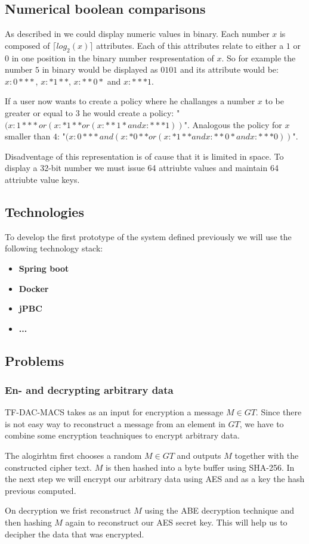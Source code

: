 \subsection{Numerical boolean comparisons}
As described in \cite{bethencourt2007ciphertext} we could display numeric values in binary. Each number $x$ is composed of $\lceil log_2(x) \rceil$ attributes. Each of this attributes relate to either a $1$ or $0$ in one position in the binary number respresentation of $x$. So for example the number $5$ in binary would be displayed as $0101$ and its attribute would be: $x:0***$, $x:*1**$, $x:**0*$ and $x:***1$. 

If a user now wants to create a policy where he challanges a number $x$ to be greater or equal to $3$ he would create a policy: "$(x:1*** or (x:*1** or (x:**1* and x:***1))$". Analogous the policy for $x$ smaller than $4$: "$(x:0*** and (x:*0** or (x:*1** and x:**0* and x:***0))$".

Disadventage of this representation is of cause that it is limited in space. To display a 32-bit number we must issue 64 attriubte values and maintain 64 attriubte value keys. 


\subsection{Technologies}
To develop the first prototype of the system defined previously we will use the following technology stack:

\begin{itemize}
	\item \textbf{Spring boot}
	\item \textbf{Docker}
	\item \textbf{jPBC} \cite{ISCC:DecIov11}
	\item \textbf{...}
\end{itemize}

\subsection{Problems}

\subsubsection{En- and decrypting arbitrary data}
TF-DAC-MACS takes as an input for encryption a message $M \in GT$. Since there is not easy way to reconstruct a message from an element in $GT$, we have to combine some encryption teachniques to encrypt arbitrary data. 

The alogirhtm first chooses a random $M \in GT$ and outputs $M$ together with the constructed cipher text. $M$ is then hashed into a byte buffer using \ac{SHA}-256. In the next step we will encrypt our arbitrary data using \ac{AES} and as a key the hash previous computed. 

On decryption we frist reconstruct $M$ using the ABE decryption technique and then hashing $M$ again to reconstruct our AES secret key. This will help us to decipher the data that was encrypted. 

